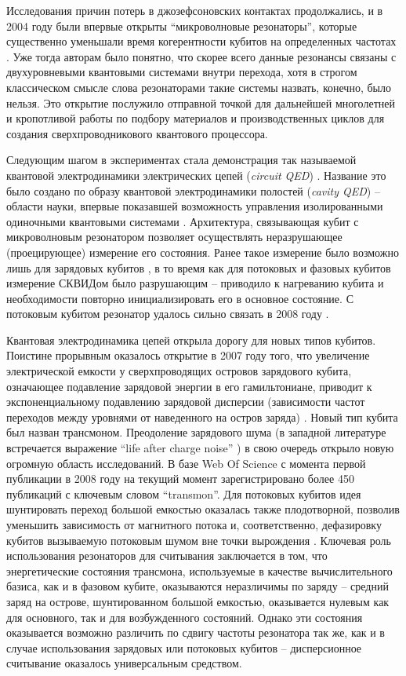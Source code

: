 \documentclass[14pt, a4paper]{extreport}
\numberwithin{equation}{section}
\begin{document}
Исследования причин потерь в джозефсоновских контактах продолжались, и в 2004 году были впервые открыты ``микроволновые резонаторы'', которые существенно уменьшали время когерентности кубитов на определенных частотах \cite{simmonds2004decoherence}. Уже тогда авторам было понятно, что скорее всего данные резонансы связаны с двухуровневыми квантовыми системами внутри перехода, хотя в строгом классическом смысле слова резонаторами такие системы назвать, конечно, было нельзя. Это открытие послужило отправной точкой для дальнейшей многолетней и кропотливой работы по подбору материалов и производственных циклов для создания сверхпроводникового квантового процессора.

Следующим шагом в экспериментах стала демонстрация так называемой квантовой электродинамики электрических цепей (\textit{circuit QED}) \cite{blais2004cavity, wallraff2004strong}. Название это было создано по образу квантовой электродинамики полостей (\textit{cavity QED}) -- области науки, впервые показавшей возможность управления изолированными одиночными квантовыми системами \cite{mabuchi2002cavity}. Архитектура, связывающая кубит с микроволновым резонатором позволяет осуществлять неразрушающее (проецирующее) измерение его состояния. Ранее такое измерение было возможно лишь для зарядовых кубитов \cite{lehnert2003measurement}, в то время как для потоковых и фазовых кубитов измерение СКВИДом было разрушающим -- приводило к нагреванию кубита и необходимости повторно инициализировать его в основное состояние. С потоковым кубитом резонатор удалось сильно связать в 2008 году \cite{abdumalikov2008vacuum}.

Квантовая электродинамика цепей открыла дорогу для новых типов кубитов. Поистине прорывным оказалось открытие в 2007 году того, что увеличение электрической емкости у сверхпроводящих островов зарядового кубита, означающее подавление зарядовой энергии в его гамильтониане, приводит к экспоненциальному подавлению зарядовой дисперсии (зависимости частот переходов между уровнями от наведенного на остров заряда) \cite{koch2007charge}. Новый тип кубита был назван трансмоном. Преодоление зарядового шума (в западной литературе встречается выражение ``life after charge noise'' \cite{houck2009life}) в свою очередь открыло новую огромную область исследований. В базе Web Of Science с момента первой публикации в 2008 году на текущий момент зарегистрировано более 450 публикаций с ключевым словом ``transmon''. Для потоковых кубитов идея шунтировать переход большой емкостью оказалась также плодотворной, позволив уменьшить зависимость от магнитного потока и, соответственно, дефазировку кубитов вызываемую потоковым шумом вне точки вырождения \cite{you2007low, yan2016flux}. Ключевая роль использования резонаторов для считывания заключается в том, что энергетические состояния трансмона, используемые в качестве вычислительного базиса, как и в фазовом кубите, оказываются неразличимы по заряду -- средний заряд на острове, шунтированном большой емкостью, оказывается нулевым как для основного, так и для возбужденного состояний. Однако эти состояния оказывается возможно различить по сдвигу частоты резонатора так же, как и в случае использования зарядовых или потоковых кубитов -- дисперсионное считывание оказалось универсальным средством.
\end{document}
